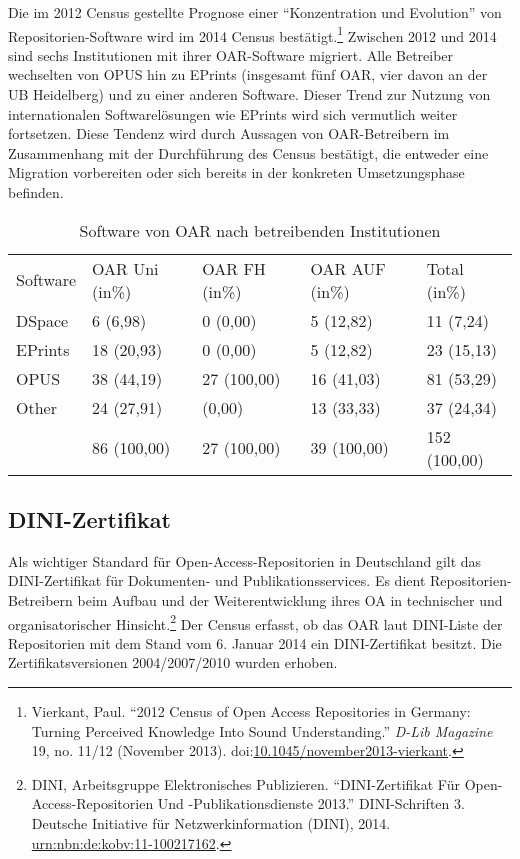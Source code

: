 \documentclass[a4paper,
fontsize=11pt,
oneside,
numbers=noperiodatend,
parskip=half-,
bibliography=totoc,
final
]{scrartcl}
\begin{document}
Die im 2012 Census gestellte Prognose einer \enquote{Konzentration und
Evolution} von Repositorien-Software wird im 2014 Census
bestätigt.\footnote{Vierkant, Paul. \enquote{2012 Census of Open Access
  Repositories in Germany: Turning Perceived Knowledge Into Sound
  Understanding.} \emph{D-Lib Magazine} 19, no. 11/12 (November 2013).
  doi:\href{http://doi.org/10.1045/november2013-vierkant}{10.1045/november2013-vierkant}.}
Zwischen 2012 und 2014 sind sechs Institutionen mit ihrer OAR-Software
migriert. Alle Betreiber wechselten von OPUS hin zu EPrints (insgesamt
fünf OAR, vier davon an der UB Heidelberg) und zu einer anderen
Software. Dieser Trend zur Nutzung von internationalen Softwarelösungen
wie EPrints wird sich vermutlich weiter fortsetzen. Diese Tendenz wird
durch Aussagen von OAR-Betreibern im Zusammenhang mit der Durchführung
des Census bestätigt, die entweder eine Migration vorbereiten oder sich
bereits in der konkreten Umsetzungsphase befinden.

\begin{table}[ht]
\centering
\begin{tabular}{lllll}
  \toprule
Software & OAR Uni (in\%)   & OAR FH (in\%)  & OAR AUF (in\%)  & Total (in\%) \\  
\cmidrule(r){1-1} \cmidrule(r){2-2} \cmidrule(r){3-3} \cmidrule(r){4-4} \cmidrule(r){5-5}
DSpace & 6 (6,98) & 0 (0,00) & 5 (12,82) & 11 (7,24) \\ 
  EPrints & 18 (20,93) & 0 (0,00) & 5 (12,82) & 23 (15,13) \\ 
  OPUS & 38 (44,19) & 27 (100,00) & 16 (41,03) & 81 (53,29) \\ 
  Other & 24 (27,91) & (0,00) & 13 (33,33) & 37 (24,34) \\ 
  \cmidrule(r){1-1} \cmidrule(r){2-2} \cmidrule(r){3-3} \cmidrule(r){4-4} \cmidrule(r){5-5}
   & 86 (100,00) & 27 (100,00) & 39 (100,00) & 152 (100,00) \\ 
   \bottomrule
\end{tabular}
\caption{Software von OAR nach betreibenden Institutionen}
\end{table}

\subsection*{DINI-Zertifikat}\label{dini-zertifikat}

Als wichtiger Standard für Open-Access-Repositorien in Deutschland gilt
das DINI-Zertifikat für Dokumenten- und Publikationsservices. Es dient
Repositorien-Betreibern beim Aufbau und der Weiterentwicklung ihres OA
in technischer und organisatorischer Hinsicht.\footnote{DINI,
  Arbeitsgruppe Elektronisches Publizieren. \enquote{DINI-Zertifikat Für
  Open-Access-Repositorien Und -Publikationsdienste 2013.}
  DINI-Schriften 3. Deutsche Initiative für Netzwerkinformation (DINI),
  2014.
  \href{http://nbn-resolving.de/urn:nbn:de:kobv:11-100217162}{urn:nbn:de:kobv:11-100217162}.}
Der Census erfasst, ob das OAR laut DINI-Liste der Repositorien mit dem
Stand vom 6. Januar 2014 ein DINI-Zertifikat besitzt. Die
Zertifikatsversionen 2004/2007/2010 wurden erhoben.
\end{document}
